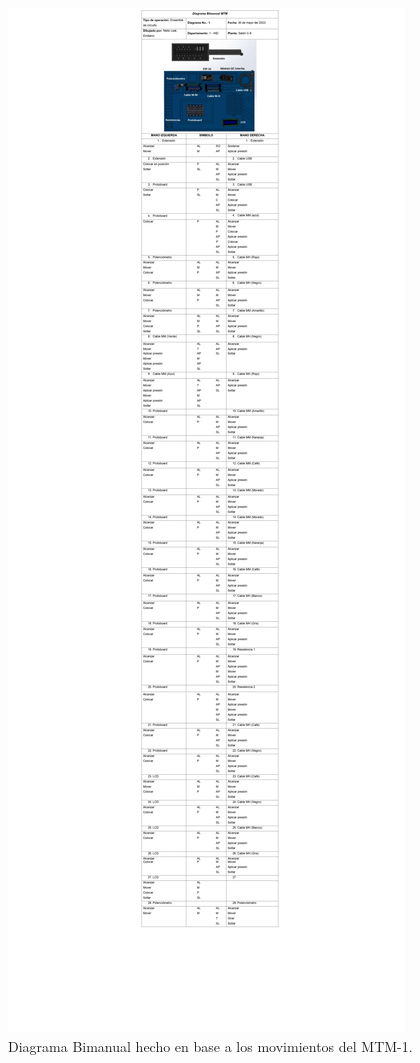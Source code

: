     \begin{figure}[H]
        \centering
        \includegraphics[trim = {260mm 210mm 250mm 1578mm},clip,scale=0.25]{19/Img/diagramaBimanual2.pdf}
        \newpage
        \caption{Diagrama Bimanual hecho en base a los movimientos del MTM-1.}
        \label{fig:diagramaBimanual23}    
    \end{figure}

